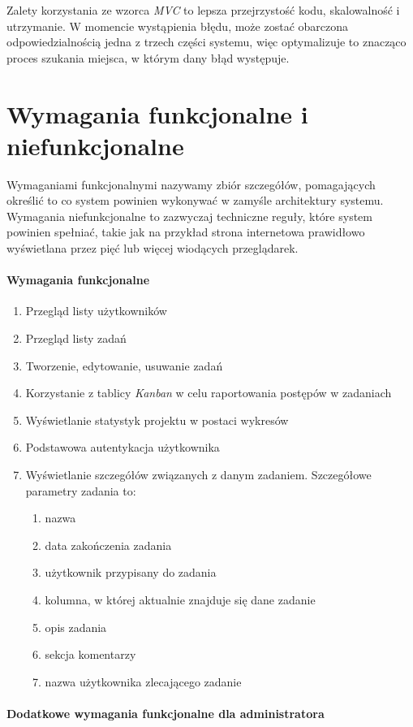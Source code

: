 Zalety korzystania ze wzorca \textit{MVC} to lepsza przejrzystość kodu, skalowalność i utrzymanie. W
momencie wystąpienia błędu, może zostać obarczona odpowiedzialnością jedna z trzech części systemu, więc optymalizuje to znacząco proces szukania miejsca, w którym dany błąd
występuje.  
\clearpage
\section{Wymagania funkcjonalne i niefunkcjonalne}
Wymaganiami funkcjonalnymi nazywamy zbiór szczegółów, pomagających określić to co system powinien wykonywać w zamyśle architektury systemu. Wymagania niefunkcjonalne to zazwyczaj techniczne reguły, które system powinien spełniać, takie jak na przykład strona internetowa prawidłowo wyświetlana przez pięć lub więcej wiodących przeglądarek.
\paragraph{Wymagania funkcjonalne}
\begin{enumerate}
	\item Przegląd listy użytkowników
	\item Przegląd listy zadań 
	\item Tworzenie, edytowanie, usuwanie zadań
	\item Korzystanie z tablicy \textit{Kanban} w celu raportowania postępów w zadaniach
	\item Wyświetlanie statystyk projektu w postaci wykresów
	\item Podstawowa autentykacja użytkownika
	\item Wyświetlanie szczegółów związanych z danym zadaniem. Szczegółowe parametry zadania to:
	\begin{enumerate}[leftmargin=3em]
		\item nazwa
		\item data zakończenia zadania
		\item użytkownik przypisany do zadania
		\item kolumna, w której aktualnie znajduje się dane zadanie
		\item opis zadania
		\item sekcja komentarzy
		\item nazwa użytkownika zlecającego zadanie
	\end{enumerate}
\end{enumerate}
\paragraph{Dodatkowe wymagania funkcjonalne dla administratora}

